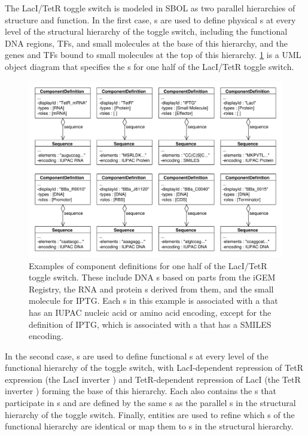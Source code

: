 The LacI/TetR toggle switch is modeled in SBOL as two parallel hierarchies of structure and function. In the first case, s are used to define physical s at every level of the structural hierarchy of the toggle switch, including the functional DNA regions, TFs, and small molecules at the base of this hierarchy, and the genes and TFs bound to small molecules at the top of this hierarchy. \ref{uml:ex_comp_defs} is a UML object diagram that specifies the s for one half of the LacI/TetR toggle switch. 

\begin{figure}[ht]
\begin{center}
\includegraphics[width=\textwidth]{example_uml/toggle_1}
\caption[]{Examples of component definitions for one half of the LacI/TetR toggle switch. These include DNA s based on parts from the iGEM Registry, the RNA and protein s derived from them, and the small molecule  for IPTG. Each s in this example is associated with a  that has an IUPAC nucleic acid or amino acid encoding, except for the definition of IPTG, which is associated with a  that has a SMILES encoding.}
\label{uml:ex_comp_defs}
\end{center}
\end{figure}

In the second case, s are used to define functional s at every level of the functional hierarchy of the toggle switch, with LacI-dependent repression of TetR expression (the LacI inverter ) and TetR-dependent repression of LacI (the TetR inverter ) forming the base of this hierarchy. Each  also contains the s that participate in s and are defined by the same s as the parallel s in the structural hierarchy of the toggle switch. Finally,  entities are used to refine which s of the functional hierarchy are identical or map them to s in the structural hierarchy.

